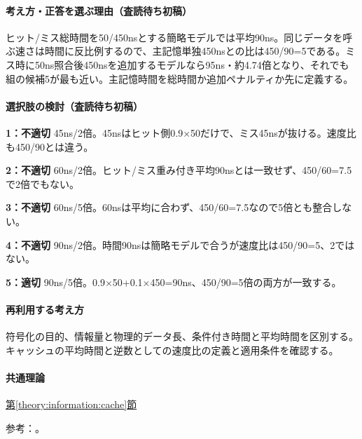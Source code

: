 \paragraph{考え方・正答を選ぶ理由（査読待ち初稿）} ヒット/ミス総時間を50/450nsとする簡略モデルでは平均90ns。同じデータを呼ぶ速さは時間に反比例するので、主記憶単独450nsとの比は450/90=\allowbreak{}5である。ミス時に50ns照合後450nsを追加するモデルなら95ns・約4.74倍となり、それでも組の候補5が最も近い。主記憶時間を総時間か追加ペナルティか先に定義する。

\paragraph{選択肢の検討（査読待ち初稿）}\mbox{}\par

\noindent\textbf{1：不適切} 45ns/2倍。45nsはヒット側0.9×50だけで、ミス45nsが抜ける。速度比も450/90とは違う。\par

\noindent\textbf{2：不適切} 60ns/2倍。ヒット/ミス重み付き平均90nsとは一致せず、450/60=\allowbreak{}7.5で2倍でもない。\par

\noindent\textbf{3：不適切} 60ns/5倍。60nsは平均に合わず、450/60=\allowbreak{}7.5なので5倍とも整合しない。\par

\noindent\textbf{4：不適切} 90ns/2倍。時間90nsは簡略モデルで合うが速度比は450/90=\allowbreak{}5、2ではない。\par

\noindent\textbf{5：適切} 90ns/5倍。0.9×50+0.1×450=\allowbreak{}90ns、450/90=\allowbreak{}5倍の両方が一致する。\par

\paragraph{再利用する考え方} 符号化の目的、情報量と物理的データ長、条件付き時間と平均時間を区別する。キャッシュの平均時間と逆数としての速度比の定義と適用条件を確認する。

\paragraph{共通理論} \hyperref[theory:information:cache]{第\ref*{theory:information:cache}節}

\par 参考：\cite{info_cache}。

